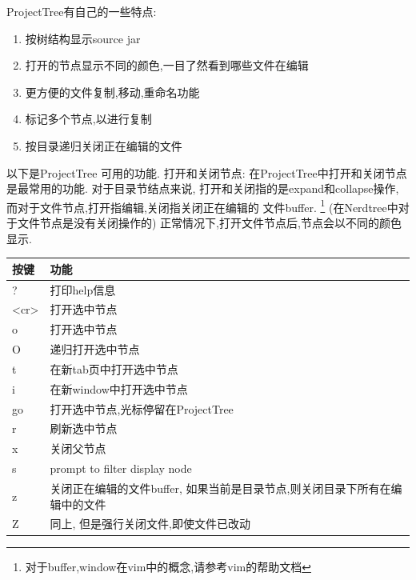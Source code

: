 \documentclass[oneside,openany]{book}
\begin{document}
  ProjectTree有自己的一些特点:
  \begin{enumerate}
    \item 按树结构显示source jar 
    \item 打开的节点显示不同的颜色,一目了然看到哪些文件在编辑
    \item 更方便的文件复制,移动,重命名功能
    \item 标记多个节点,以进行复制
    \item 按目录递归关闭正在编辑的文件
  \end{enumerate}

  以下是ProjectTree 可用的功能.
  \newline
  打开和关闭节点: 在ProjectTree中打开和关闭节点是最常用的功能. 对于目录节结点来说,
打开和关闭指的是expand和collapse操作, 而对于文件节点,打开指编辑,关闭指关闭正在编辑的
文件buffer. \footnote{对于buffer,window在vim中的概念,请参考vim的帮助文档}
  \newline
  (在Nerdtree中对于文件节点是没有关闭操作的)
  \newline
  正常情况下,打开文件节点后,节点会以不同的颜色显示.
  \begin{table}[H]
  \centering
      \begin{tabular}{p{40pt}p{220pt}}
        \toprule
        按键& 功能\\
        \midrule
          ?     &打印help信息\\
          <cr>  &打开选中节点\\
          o     &打开选中节点\\
          O     &递归打开选中节点\\
          t     &在新tab页中打开选中节点\\
          i     &在新window中打开选中节点\\
          go    &打开选中节点,光标停留在ProjectTree\\
          r     &刷新选中节点\\
          x     &关闭父节点\\
          s     &prompt to filter display node\\
          z     &关闭正在编辑的文件buffer, 如果当前是目录节点,则关闭目录下所有在编辑中的文件\\
          Z     &同上, 但是强行关闭文件,即使文件已改动\\
      \bottomrule
      \end{tabular}
  \end{table}
\end{document}
